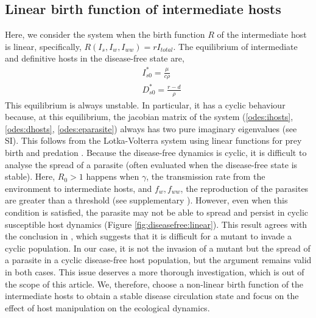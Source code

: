 \documentclass[11pt]{article}
\begin{document}
\subsection*{Linear birth function of intermediate hosts}
Here, we consider the system when the birth function $R$ of the intermediate host is linear, specifically, $R(I_s, I_w, I_{ww}) = r I_{total}$. 
The equilibrium of intermediate and definitive hosts in the disease-free state are,
%
\begin{align*}
& I_{s0}^* = \frac{\mu}{c \rho} \\
& D_{s0}^* = \frac{r - d}{\rho}
\end{align*}
%
This equilibrium is always unstable. 
In particular, it has a cyclic behaviour because, at this equilibrium, the jacobian matrix of the system (\ref{odes:ihosts}, \ref{odes:dhosts}, \ref{odes:eparasite}) always has two pure imaginary eigenvalues (see SI). 
This follows from the Lotka-Volterra system using linear functions for prey birth and predation \citep{Lotka1920}.
Because the disease-free dynamics is cyclic, it is difficult to analyse the spread of a parasite (often evaluated when the disease-free state is stable). 
Here,  $R_0 > 1$  happens when $\gamma$, the transmission rate from the environment to intermediate hosts, and $f_w, f_{ww}$, the reproduction of the parasites are greater than a threshold (see supplementary ). 
However, even when this condition is satisfied, the parasite may not be able to spread and persist in cyclic susceptible host dynamics (Figure \ref{fig:diseasefree:linear}). 
This result agrees with the conclusion in \citep{Ripa:Evol:2013}, which suggests that it is difficult for a mutant to invade a cyclic population. 
In our case, it is not the invasion of a mutant but the spread of a parasite in a cyclic disease-free host population, but the argument remains valid in both cases. 
This issue deserves a more thorough investigation, which is out of the scope of this article. 
We, therefore, choose a non-linear birth function of the intermediate hosts to obtain a stable disease circulation state and focus on the effect of host manipulation on the ecological dynamics. 
\end{document}

